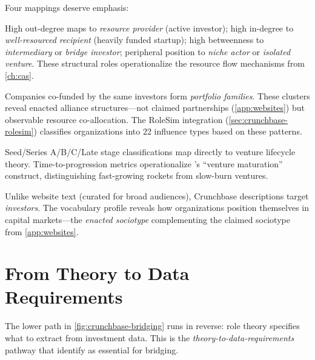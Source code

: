 \documentclass[../main.tex]{subfiles}
\begin{document}
Four mappings deserve emphasis:

\begin{description}[leftmargin=0.5cm, itemsep=0.3em]
\item[Network position $\rightarrow$ Resource role.]
High out-degree maps to \emph{resource provider} (active investor);
high in-degree to \emph{well-resourced recipient} (heavily funded startup);
high betweenness to \emph{intermediary} or \emph{bridge investor};
peripheral position to \emph{niche actor} or \emph{isolated venture}.
These structural roles operationalize the resource flow mechanisms
from \cref{ch:cas}.

\item[Co-investment clusters $\rightarrow$ Alliance constellations.]
Companies co-funded by the same investors form \emph{portfolio families}.
These clusters reveal enacted alliance structures---not claimed partnerships
(\cref{app:websites}) but observable resource co-allocation.
The RoleSim integration (\cref{sec:crunchbase-rolesim}) classifies
organizations into 22 influence types based on these patterns.

\item[Funding stage sequence $\rightarrow$ Lifecycle positioning.]
Seed/Series A/B/C/Late stage classifications map directly to
venture lifecycle theory.
Time-to-progression metrics operationalize \textcite{nathan2017crunchbase}'s
``venture maturation'' construct, distinguishing fast-growing rockets from
slow-burn ventures.

\item[Description vocabulary $\rightarrow$ Enacted sociotype.]
Unlike website text (curated for broad audiences), Crunchbase descriptions
target \emph{investors}.
The vocabulary profile reveals how organizations position themselves
in capital markets---the \emph{enacted sociotype} complementing
the claimed sociotype from \cref{app:websites}.
\end{description}


\section{From Theory to Data Requirements}
\label{sec:crunchbase-theory-data}

The lower path in \cref{fig:crunchbase-bridging} runs in reverse:
role theory specifies what to extract from investment data.
This is the \emph{theory-to-data-requirements} pathway that
\textcite{maass2018data} identify as essential for bridging.
\end{document}
